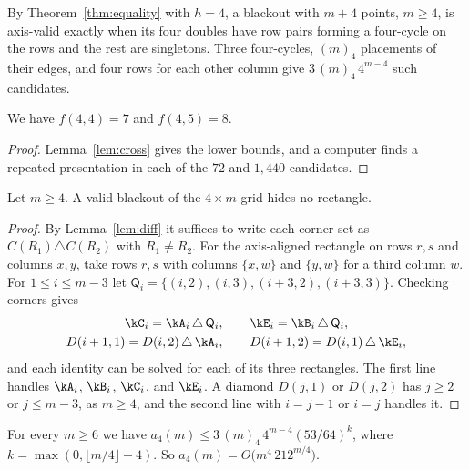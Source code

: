 By Theorem~\ref{thm:equality} with $h=4$, a blackout with $m+4$ points, $m\ge4$, is axis-valid exactly when its four doubles have row pairs forming a four-cycle on the rows and the rest are singletons. Three four-cycles, $(m)_4$ placements of their edges, and four rows for each other column give $3\,(m)_4\,4^{m-4}$ such candidates.

\begin{corollary}\label{cor:fourboundary}
We have $f(4,4)=7$ and $f(4,5)=8$.
\end{corollary}

\begin{proof}
Lemma~\ref{lem:cross} gives the lower bounds, and a computer finds a repeated presentation in each of the $72$ and $1{,}440$ candidates.
\end{proof}

\begin{theorem}\label{thm:hidden}
Let $m\ge4$. A valid blackout of the $4\times m$ grid hides no rectangle.
\end{theorem}

\begin{proof}
By Lemma~\ref{lem:diff} it suffices to write each corner set as $C(R_1)\triangle C(R_2)$ with $R_1\ne R_2$. For the axis-aligned rectangle on rows $r,s$ and columns $x,y$, take rows $r,s$ with columns $\{x,w\}$ and $\{y,w\}$ for a third column $w$. For $1\le i\le m-3$ let $\mathsf Q_i=\{(i,2),(i,3),(i+3,2),(i+3,3)\}$. Checking corners gives
\begin{equation}\label{eq:fourxor}
\begin{gathered}
\kC_i=\kA_i\,\triangle\,\mathsf Q_i,\qquad \kE_i=\kB_i\,\triangle\,\mathsf Q_i,\\
D(i+1,1)=D(i,2)\,\triangle\,\kA_i,\qquad D(i+1,2)=D(i,1)\,\triangle\,\kE_i,
\end{gathered}
\end{equation}
and each identity can be solved for each of its three rectangles. The first line handles $\kA_i$, $\kB_i$, $\kC_i$, and $\kE_i$. A diamond $D(j,1)$ or $D(j,2)$ has $j\ge2$ or $j\le m-3$, as $m\ge4$, and the second line with $i=j-1$ or $i=j$ handles it.
\end{proof}

\begin{theorem}\label{thm:foursurvival}
For every $m\ge6$ we have $a_4(m)\le3\,(m)_4\,4^{m-4}(53/64)^k$, where
$k=\max(0,\lfloor m/4\rfloor-4)$. So $a_4(m)=O\bigl(m^4\,212^{m/4}\bigr)$.
\end{theorem}

